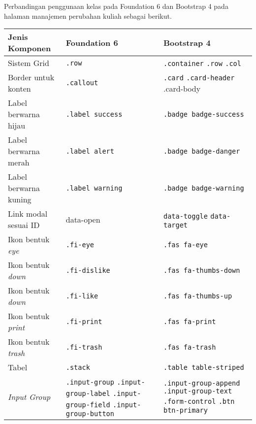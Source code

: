 \noindent Perbandingan penggunaan kelas pada Foundation 6 dan Bootstrap 4 pada halaman manajemen perubahan kuliah sebagai berikut.\\
\begin{tabular}{| p{} | p{} | p{} |} 
	\hline
	\textbf{Jenis Komponen} & \textbf{Foundation 6} & \textbf{Bootstrap 4}  \\ [0.5ex] 
	\hline	
	Sistem Grid & \texttt{.row} &   \texttt{.container} \newline \texttt{.row} \newline \texttt{.col} \\ 
	\hline	
	Border untuk konten & \texttt{.callout} &  \texttt{.card} \newline \texttt{.card-header} \newline .card-body \\	
	\hline	
	Label berwarna hijau & \texttt{.label success} &  \texttt{.badge badge-success} \\
	\hline	
	Label berwarna merah &\texttt{.label alert} & \texttt{.badge badge-danger}  \\
	\hline	
	Label berwarna kuning & \texttt{.label warning} & \texttt{.badge badge-warning}  \\
	\hline	
	Link modal sesuai ID & data-open & \texttt{data-toggle} \newline \texttt{data-target} \\
	\hline
	Ikon bentuk \textit{eye} & \texttt{.fi-eye} &  \texttt{.fas fa-eye} \\	
	\hline	
	Ikon bentuk \textit{down} & \texttt{.fi-dislike} &  \texttt{.fas fa-thumbs-down} \\	
	\hline
	Ikon bentuk \textit{down} & \texttt{.fi-like} &  \texttt{.fas fa-thumbs-up} \\	
	\hline
	Ikon bentuk \textit{print} & \texttt{.fi-print} &  \texttt{.fas fa-print} \\	
	\hline
	Ikon bentuk \textit{trash} & \texttt{.fi-trash} &  \texttt{.fas fa-trash} \\	
	\hline
	Tabel & \texttt{.stack} & \texttt{.table table-striped}  \\
	\hline	
	\textit{Input Group} & \texttt{.input-group} \newline \texttt{.input-group-label} \newline \texttt{.input-group-field} \newline \texttt{.input-group-button} & \texttt{.input-group-append} \newline \texttt{.input-group-text} \newline \texttt{.form-control} \newline \texttt{.btn btn-primary} \\[1ex]
	\hline	
\end{tabular}



